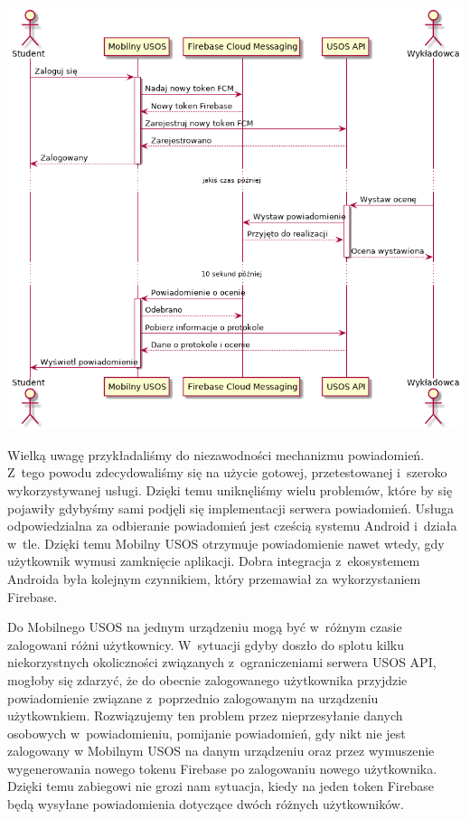 \documentclass{pracamgr}
\begin{document}
\begingroup
\centering
\includegraphics[scale=0.5]{img/firebase.png}
\label{fig:firebase}
\medskip
\endgroup

Wielką uwagę przykładaliśmy do niezawodności mechanizmu powiadomień. Z~tego powodu
zdecydowaliśmy się na użycie gotowej, przetestowanej i~szeroko wykorzystywanej
usługi. Dzięki temu uniknęliśmy wielu problemów, które by się pojawiły gdybyśmy
sami podjęli się implementacji serwera powiadomień. Usługa odpowiedzialna za
odbieranie powiadomień jest cześcią systemu Android i~działa w~tle. Dzięki temu
Mobilny USOS otrzymuje powiadomienie nawet wtedy, gdy użytkownik wymusi zamknięcie
aplikacji. Dobra integracja z~ekosystemem Androida była kolejnym czynnikiem, który
przemawiał za wykorzystaniem Firebase.

Do Mobilnego USOS na jednym urządzeniu mogą być w~różnym czasie zalogowani różni
użytkownicy. W~sytuacji gdyby doszło do splotu kilku niekorzystnych okoliczności
związanych z~ograniczeniami serwera USOS API, mogłoby się zdarzyć, że do obecnie
zalogowanego użytkownika przyjdzie powiadomienie związane z~poprzednio zalogowanym
na urządzeniu użytkownkiem. Rozwiązujemy ten problem przez nieprzesyłanie danych
osobowych w~powiadomieniu, pomijanie powiadomień, gdy nikt nie jest zalogowany w
Mobilnym USOS na danym urządzeniu oraz przez wymuszenie wygenerowania nowego tokenu
Firebase po zalogowaniu nowego użytkownika. Dzięki temu zabiegowi nie grozi nam
sytuacja, kiedy na jeden token Firebase będą wysyłane powiadomienia dotyczące dwóch
różnych użytkowników.
\end{document}
